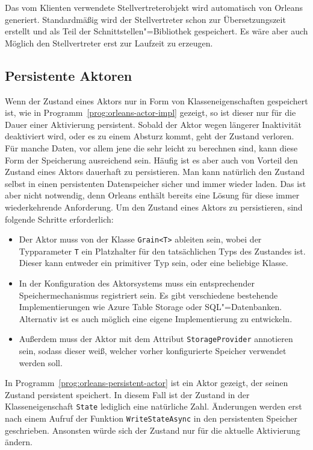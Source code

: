 \iffalse $ \fi

Das vom Klienten verwendete Stellvertreterobjekt wird automatisch von Orleans generiert. Standardmäßig wird der Stellvertreter schon zur Übersetzungszeit erstellt und als Teil der Schnittstellen"=Bibliothek gespeichert. Es wäre aber auch Möglich den Stellvertreter erst zur Laufzeit zu erzeugen.

\subsection{Persistente Aktoren}

Wenn der Zustand eines Aktors nur in Form von Klasseneigenschaften gespeichert ist, wie in Programm~\ref{prog:orleans-actor-impl} gezeigt, so ist dieser nur für die Dauer einer Aktivierung persistent. Sobald der Aktor wegen längerer Inaktivität deaktiviert wird, oder es zu einem Absturz kommt, geht der Zustand verloren. Für manche Daten, vor allem jene die sehr leicht zu berechnen sind, kann diese Form der Speicherung ausreichend sein. Häufig ist es aber auch von Vorteil den Zustand eines Aktors dauerhaft zu persistieren. Man kann natürlich den Zustand selbst in einen persistenten Datenspeicher sicher und immer wieder laden. Das ist aber nicht notwendig, denn Orleans enthält bereits eine Lösung für diese immer wiederkehrende Anforderung. Um den Zustand eines Aktors zu persistieren, sind folgende Schritte erforderlich:

\begin{itemize}
	\item Der Aktor muss von der Klasse \lstinline{Grain<T>} ableiten sein, wobei der Typparameter \lstinline{T} ein Platzhalter für den tatsächlichen Typs des Zustandes ist. Dieser kann entweder ein primitiver Typ sein, oder eine beliebige Klasse.
	\item In der Konfiguration des Aktorsystems muss ein entsprechender Speichermechanismus registriert sein. Es gibt verschiedene bestehende Implementierungen wie \zB Azure Table Storage oder SQL"=Datenbanken. Alternativ ist es auch möglich eine eigene Implementierung zu entwickeln.
	\item Außerdem muss der Aktor mit dem Attribut \lstinline{StorageProvider} annotieren sein, sodass dieser weiß, welcher vorher konfigurierte Speicher verwendet werden soll.
\end{itemize}

In Programm~\ref{prog:orleans-persistent-actor} ist ein Aktor gezeigt, der seinen Zustand persistent speichert. In diesem Fall ist der Zustand in der Klasseneigenschaft \lstinline{State} lediglich eine natürliche Zahl. Änderungen werden erst nach einem Aufruf der Funktion \lstinline{WriteStateAsync} in den persistenten Speicher geschrieben. Ansonsten würde sich der Zustand nur für die aktuelle Aktivierung ändern.

